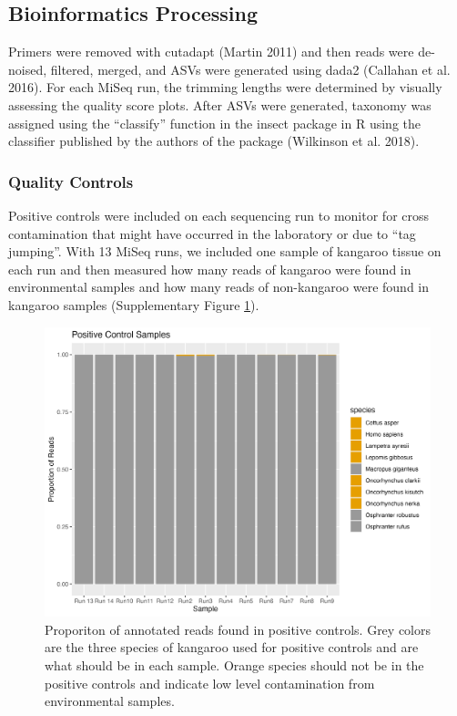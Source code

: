 \documentclass[
]{article}
\begin{document}
\hypertarget{bioinformatics-processing}{%
\subsection{Bioinformatics Processing}\label{bioinformatics-processing}}

Primers were removed with cutadapt (Martin 2011) and then reads were
de-noised, filtered, merged, and ASVs were generated using dada2
(Callahan et al. 2016). For each MiSeq run, the trimming lengths were
determined by visually assessing the quality score plots. After ASVs
were generated, taxonomy was assigned using the ``classify'' function in
the insect package in R using the classifier published by the authors of
the package (Wilkinson et al. 2018).

\hypertarget{quality-controls}{%
\subsubsection{Quality Controls}\label{quality-controls}}

Positive controls were included on each sequencing run to monitor for
cross contamination that might have occurred in the laboratory or due to
``tag jumping''. With 13 MiSeq runs, we included one sample of kangaroo
tissue on each run and then measured how many reads of kangaroo were
found in environmental samples and how many reads of non-kangaroo were
found in kangaroo samples (Supplementary Figure \ref{fig:controls1}).

\begin{figure}
\centering
\includegraphics{../Output/SupplementalFigures/check_controls.png}
\caption{Proporiton of annotated reads found in positive controls. Grey
colors are the three species of kangaroo used for positive controls and
are what should be in each sample. Orange species should not be in the
positive controls and indicate low level contamination from
environmental samples.\label{fig:controls1}}
\end{figure}
\end{document}
